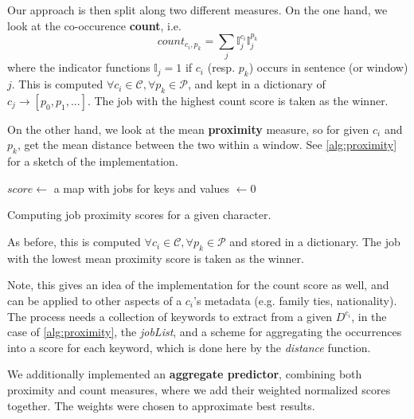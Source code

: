 Our approach is then split along two different measures. On the one hand, we look at the co-occurence \textbf{count}, i.e. 
\begin{equation}
count_{c_i, p_k} = \sum_j \mathbb{I}^{c_i}_j \mathbb{I}^{p_k}_j
\end{equation}
where the indicator functions $\mathbb{I}_j = 1$ if $c_i$ (resp. $p_k$) occurs in sentence (or window) $j$. This is computed $\forall c_i \in \mathcal{C}, \forall p_k \in \mathcal{P}$, and kept in a dictionary of $c_j \rightarrow [p_0, p_1, ...]$. The job with the highest count score is taken as the winner. 

On the other hand, we look at the mean \textbf{proximity} measure, so for given $c_i$ and $p_k$, get the mean distance between the two within a window. See \cref{alg:proximity} for a sketch of the implementation. 

\begin{algorithm} 
  $score \leftarrow$ a map with jobs for keys and values $\leftarrow 0$\;
  \caption{Computing job proximity scores for a given character.}
  \label{alg:proximity}
\end{algorithm}

As before, this is computed $\forall c_i \in \mathcal{C}, \forall p_k \in \mathcal{P}$ and stored in a dictionary. The job with the lowest mean proximity score is taken as the winner.

Note, this gives an idea of the implementation for the count score as well, and can be applied to other aspects of a $c_i$'s metadata (e.g. family ties, nationality). The process needs a collection of keywords to extract from a given $D^{c_i}$, in the case of \cref{alg:proximity}, the \textit{jobList}, and a scheme for aggregating the occurrences into a score for each keyword, which is done here by the \textit{distance} function.

We additionally implemented an \textbf{aggregate predictor}, combining both proximity and count measures, where we add their weighted normalized scores together. The weights were chosen to approximate best results.


